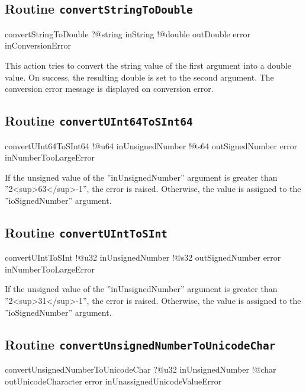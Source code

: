 \subsection{Routine \texttt{convertStringToDouble}}

\begin{galgas4}
convertStringToDouble ?@string inString
                      !@double outDouble
                      error inConversionError
\end{galgas4}

This action tries to convert the string value of the first argument into a double value. On success, the resulting double is set to the second argument. The conversion error message is displayed on conversion error.

\subsection{Routine \texttt{convertUInt64ToSInt64}}

\begin{galgas4}
convertUInt64ToSInt64 !@u64 inUnsignedNumber
                      !@s64 outSignedNumber
                      error inNumberTooLargeError
\end{galgas4}

If the unsigned value of the ''inUnsignedNumber'' argument is greater than ''2<sup>63</sup>-1'', the error is raised. Otherwise, the value is assigned to the ''ioSignedNumber'' argument.

\subsection{Routine \texttt{convertUIntToSInt}}

\begin{galgas4}
convertUIntToSInt !@u32 inUnsignedNumber
                  !@s32 outSignedNumber
                  error inNumberTooLargeError
\end{galgas4}

If the unsigned value of the ''inUnsignedNumber'' argument is greater than ''2<sup>31</sup>-1'', the error is raised. Otherwise, the value is assigned to the ''ioSignedNumber'' argument.

\subsection{Routine \texttt{convertUnsignedNumberToUnicodeChar}}

\begin{galgas4}
convertUnsignedNumberToUnicodeChar ?@u32 inUnsignedNumber
                                   !@char outUnicodeCharacter
                                   error inUnassignedUnicodeValueError
\end{galgas4}

